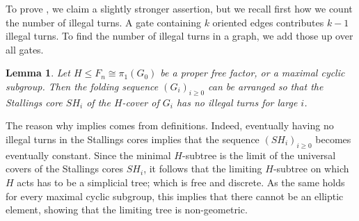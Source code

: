 \documentclass[11pt, letterpaper]{amsart}
\theoremstyle{plain}
\newtheorem{lemma}[theorem]{Lemma}
\theoremstyle{definition}
\begin{document}
To prove , we claim a slightly stronger assertion, but we recall first how we count the number of illegal turns. A gate containing $k$ oriented edges contributes $k-1$ illegal turns. To find the number of illegal turns in a graph, we add those up over all gates. 
\begin{lemma}\label{lem:arational_main}
    Let $H \le F_n \cong \pi_1(G_0)$ be a proper free factor, or a maximal
    cyclic subgroup. Then the folding sequence $(G_i)_{i \ge 0}$ can be arranged
    so that the Stallings core $SH_i$ of the $H$-cover of $G_i$ has no illegal turns for large $i$.
\end{lemma}

The reason why  implies  comes from definitions. 
Indeed, eventually having no illegal turns in the Stallings cores implies that the sequence $(SH_i)_{i \ge 0}$ becomes eventually constant. Since the minimal $H$-subtree is the limit of the universal covers of the Stallings cores $SH_i$, it follows that the limiting $H$-subtree on which $H$ acts has to be a simplicial tree; which is free and discrete. As the same holds for every maximal cyclic subgroup, this implies that there cannot be an elliptic element, showing that the limiting tree is non-geometric.
\end{document}
